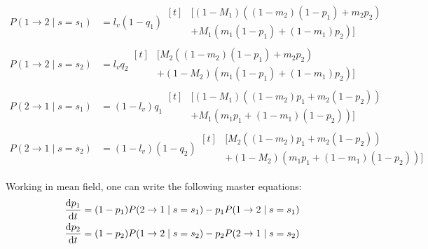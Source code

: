 \documentclass[../thesis.tex]{subfiles}
\begin{document}
\begin{equation}
    \label{eq:final_trans_probs}
    \begin{aligned}
        P(1 \rightarrow 2 \mid s = s_1)
            &= l_v (1 - q_1)
            \begin{aligned}[t]
            &[(1 - M_1) ((1 - m_2) (1 - p_1) + m_2 p_2)
            \\
            & + M_1 (m_1 (1 - p_1) + (1 - m_1) p_2)]
            \end{aligned}
        \\
        P(1 \rightarrow 2 \mid s = s_2)
            &= l_v q_2
            \begin{aligned}[t]
                &[M_2 ((1 - m_2) (1 - p_1) + m_2 p_2)
                \\
                &+ (1 - M_2) (m_1 (1 - p_1) + (1 - m_1) p_2)]
            \end{aligned}
        \\
        P(2 \rightarrow 1 \mid s = s_1)
            &= (1 - l_v) q_1
            \begin{aligned}[t]
                &[(1 - M_1) ((1 - m_2) p_1 + m_2 (1 - p_2))
                \\
                &+ M_1 (m_1 p_1 + (1 - m_1) (1 - p_2))]
            \end{aligned}
        \\
        P(2 \rightarrow 1 \mid s = s_2)
            &= (1 - l_v) (1 - q_2)
            \begin{aligned}[t]
                &[M_2 ((1 - m_2) p_1 + m_2 (1 - p_2))
                \\
                &+ (1 - M_2) (m_1 p_1 + (1 - m_1) (1 - p_2))]
            \end{aligned}
    \end{aligned}
\end{equation}

Working in mean field, one can write the following master equations:
\begin{equation}
    \label{eq:time_evol}
    \begin{aligned}
        \dv{p_1}{t} 
            &= (1 - p_1) P(2 \rightarrow 1 \mid s = s_1)
                - p_1 P(1 \rightarrow 2 \mid s = s_1)
        \\
        \dv{p_2}{t} 
            &= (1 - p_2) P(1 \rightarrow 2 \mid s = s_2)
                 - p_2 P(2 \rightarrow 1 \mid s = s_2)
    \end{aligned}
\end{equation}
\end{document}
